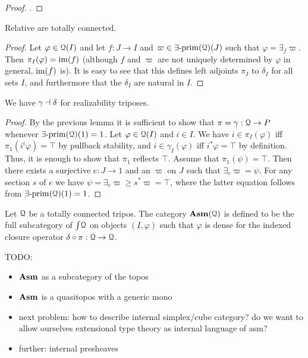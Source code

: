 \begin{proof}
\cite[3.4.34]{frey2013fibrational}.
\end{proof}
\begin{lemma}
Relative \rtrips are totally connected.
\end{lemma}
\begin{proof}
Let $\varphi\in{\EuScript{Q}}(I)$ and let $f:J\to I$ and $\varpi\in\exists\text{-}\mathrm{prim}({\EuScript{Q}})(J)$ such
that $\varphi = \exists_f\varpi$. Then $\pi_I(\varphi)=\mathrm{im}(f)$ (although $f$
and $\varpi$ are not uniquely determined by $\varphi$ in general, $\mathrm{im}(f)$
is). It is easy to see that this defines left adjoints $\pi_I$ to $\delta_I$ 
for all sets $I$, and furthermore that the $\delta_I$ are natural in $I$.
\end{proof}
\begin{lemma}
We have $\gamma\dashv\delta$ for realizability triposes.
\end{lemma}
\begin{proof}
By the previous lemma it is sufficient to show that $\pi=\gamma:{\EuScript{Q}}\to P$
whenever $\exists\text{-}\mathrm{prim}({\EuScript{Q}})(1)=1$. Let $\varphi\in{\EuScript{Q}}(I)$ and $i\in I$. We have
$i\in \pi_I(\varphi)$ iff $\pi_1(i^i\varphi)=\top$ by pullback stability, and
$i\in\gamma_I(\varphi)$ iff $i^*\varphi=\top$ by definition. Thus, it is enough
to show that $\pi_1$ reflects $\top$. Assume that $\pi_1(\psi)=\top$. Then there
exists a surjective $e:J\to 1$ and an \eprime $\varpi$ on $J$ such that
$\exists_e\varpi=\psi$. For any section $s$ of $e$ we have $\psi =
\exists_e\varpi \geq s^* \varpi = \top$, where the latter equation follows from
$\exists\text{-}\mathrm{prim}({\EuScript{Q}})(1)=1$.
\end{proof}

\begin{definition}
Let ${\EuScript{Q}}$ be a totally connected tripos. The category $\mathbf{Asm}({\EuScript{Q}})$ is 
defined to be the full subcategory of $\textstyle\int\!{\EuScript{Q}}$ on objects $(I,\varphi)$
such that $\varphi$ is dense for the indexed closure operator 
$\delta\circ\pi:{\EuScript{Q}}\to{\EuScript{Q}}$.
\end{definition}


TODO: 
\begin{itemize}
\item $\mathbf{Asm}$ as a subcategory of the topos
\item $\mathbf{Asm}$ is a quasitopos with a generic mono
\item next problem: how to describe internal simplex/cube category? do we want 
to allow ourselves extensional type theory as internal language of asm?
\item further: internal presheaves
\end{itemize}